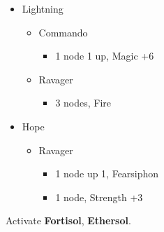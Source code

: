 \begin{menu}
	\begin{itemize}
		\crystarium
		\begin{itemize}
			\item Lightning
			      \begin{itemize}
				      \item Commando
				            \begin{itemize}
					            \item 1 node 1 up, Magic +6
				            \end{itemize}
				      \item Ravager
				            \begin{itemize}
					            \item 3 nodes, Fire
				            \end{itemize}
			      \end{itemize}
			\item Hope
			      \begin{itemize}
				      \item Ravager
				            \begin{itemize}
					            \item 1 node up 1, Fearsiphon
					            \item 1 node, Strength +3
				            \end{itemize}
			      \end{itemize}
		\end{itemize}
	\end{itemize}
\end{menu}
Activate \textbf{Fortisol}, \textbf{Ethersol}.

